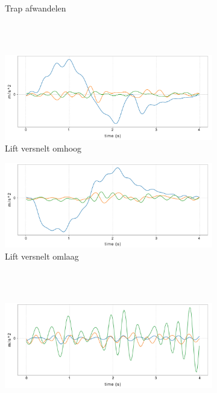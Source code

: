 \documentclass{article}
\providecommand{\DIFaddbeginFL}{} %
\providecommand{\DIFaddendFL}{} %
\providecommand{\DIFdelbeginFL}{} %
\providecommand{\DIFdelendFL}{} %
\begin{document}
\begin{figure}[h!]
\begin{subfigure}[b]{.49\linewidth}
    \DIFaddendFL \caption{Trap afwandelen}\label{fig:1f}
  \end{subfigure} \\~\\
  \begin{subfigure}[b]{.49\linewidth}
    \centering
    \DIFdelbeginFL %
\DIFdelendFL \DIFaddbeginFL \includegraphics[width=.80\textwidth]{figures/liftau}
    \DIFaddendFL \caption{Lift versnelt omhoog}\label{fig:1g}
  \end{subfigure}
  \begin{subfigure}[b]{.49\linewidth}
    \centering
    \DIFdelbeginFL %
\DIFdelendFL \DIFaddbeginFL \includegraphics[width=.80\textwidth]{figures/liftad}
    \DIFaddendFL \caption{Lift versnelt omlaag}\label{fig:1h}
  \end{subfigure} \\~\\
  \begin{subfigure}[b]{.49\linewidth}
    \centering
    \DIFdelbeginFL %
\DIFdelendFL \DIFaddbeginFL \includegraphics[width=.80\textwidth]{figures/tandenpoetsen}

\end{subfigure}
\end{figure}
\end{document}

